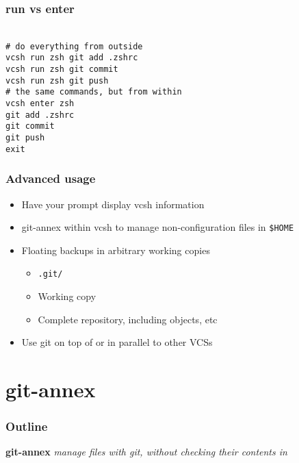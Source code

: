 \documentclass[t]{beamer}
\begin{document}
\begin{frame}
	\frametitle{run vs enter}
	\texttt{ \\
		\# do everything from outside \\
		vcsh run zsh git add .zshrc \\
		vcsh run zsh git commit \\
		vcsh run zsh git push \\
		\# the same commands, but from within\\
		vcsh enter zsh \\
		git add .zshrc \\
		git commit \\
		git push \\
		exit
	}
\end{frame}

\begin{frame}
	\frametitle{Advanced usage}
	\begin{itemize}
		\item Have your prompt display vcsh information
		\item git-annex within vcsh to manage non-configuration files in \texttt{\$HOME}
		\item Floating backups in arbitrary working copies
		\begin{itemize}
			\item \texttt{.git/}
			\item Working copy
			\item Complete repository, including objects, etc
		\end{itemize}
		\item Use git on top of or in parallel to other VCSs
	\end{itemize}
\end{frame}


\section{git-annex}

\begin{frame}
	\frametitle{Outline}
	\tableofcontents[currentsection]
\end{frame}

\begin{frame}
		\begin{center}
			\vfill
			\vfill
			\textbf{git-annex}
			\vfill
			\textit{manage files with git, without checking their contents in}
			\vfill
			\vfill
		\end{center}
\end{frame}
\end{document}
